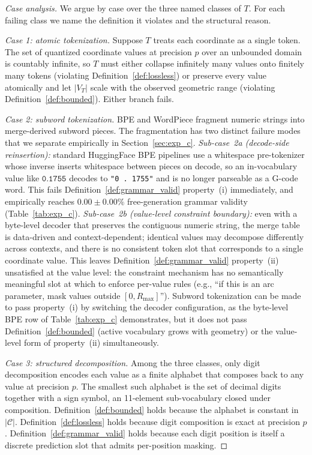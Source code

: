 \documentclass[sensors,article,submit,moreauthors,pdftex]{Definitions/mdpi}
\begin{document}
\begin{proof}[Case analysis]
We argue by case over the three named classes of $T$. For each failing class we name the definition it violates and the structural reason.

\smallskip\noindent\textit{Case 1: atomic tokenization.} Suppose $T$ treats each coordinate as a single token. The set of quantized coordinate values at precision $p$ over an unbounded domain is countably infinite, so $T$ must either collapse infinitely many values onto finitely many tokens (violating Definition~\ref{def:lossless}) or preserve every value atomically and let $|V_T|$ scale with the observed geometric range (violating Definition~\ref{def:bounded}). Either branch fails.

\smallskip\noindent\textit{Case 2: subword tokenization.} BPE and WordPiece fragment numeric strings into merge-derived subword pieces. The fragmentation has two distinct failure modes that we separate empirically in Section~\ref{sec:exp_c}. \emph{Sub-case~2a (decode-side reinsertion):} standard HuggingFace BPE pipelines use a whitespace pre-tokenizer whose inverse inserts whitespace between pieces on decode, so an in-vocabulary value like $\texttt{0.1755}$ decodes to \texttt{"0 . 1755"} and is no longer parseable as a G-code word. This fails Definition~\ref{def:grammar_valid} property~(i) immediately, and empirically reaches $0.00 \pm 0.00\%$ free-generation grammar validity (Table~\ref{tab:exp_c}). \emph{Sub-case~2b (value-level constraint boundary):} even with a byte-level decoder that preserves the contiguous numeric string, the merge table is data-driven and context-dependent; identical values may decompose differently across contexts, and there is no consistent token slot that corresponds to a single coordinate value. This leaves Definition~\ref{def:grammar_valid} property~(ii) unsatisfied at the value level: the constraint mechanism has no semantically meaningful slot at which to enforce per-value rules (e.g., ``if this is an arc parameter, mask values outside $[0, R_{\max}]$''). Subword tokenization can be made to pass property~(i) by switching the decoder configuration, as the byte-level BPE row of Table~\ref{tab:exp_c} demonstrates, but it does not pass Definition~\ref{def:bounded} (active vocabulary grows with geometry) or the value-level form of property~(ii) simultaneously.

\smallskip\noindent\textit{Case 3: structured decomposition.} Among the three classes, only digit decomposition encodes each value as a finite alphabet that composes back to any value at precision $p$. The smallest such alphabet is the set of decimal digits together with a sign symbol, an 11-element sub-vocabulary closed under composition. Definition~\ref{def:bounded} holds because the alphabet is constant in $|\mathcal{C}|$. Definition~\ref{def:lossless} holds because digit composition is exact at precision $p$. Definition~\ref{def:grammar_valid} holds because each digit position is itself a discrete prediction slot that admits per-position masking.
\end{proof}
\end{document}
